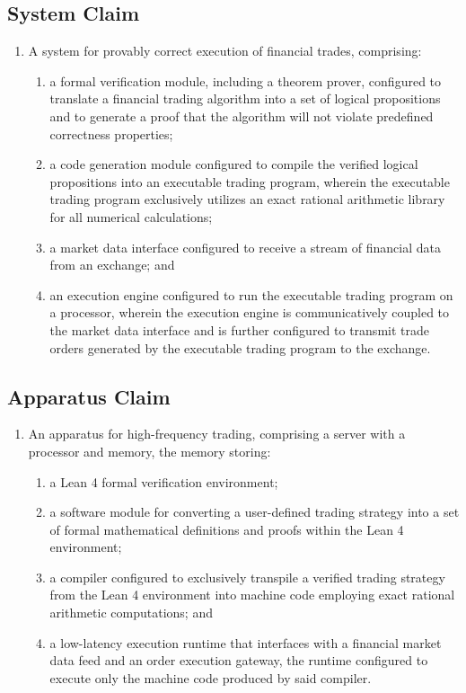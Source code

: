 \documentclass{article}
\begin{document}
\subsection{System Claim}
\begin{enumerate}[label=1.]
    \item A system for provably correct execution of financial trades, comprising:
    \begin{enumerate}[label=(\alph*)]
        \item a formal verification module, including a theorem prover, configured to translate a financial trading algorithm into a set of logical propositions and to generate a proof that the algorithm will not violate predefined correctness properties;
        \item a code generation module configured to compile the verified logical propositions into an executable trading program, wherein the executable trading program exclusively utilizes an exact rational arithmetic library for all numerical calculations;
        \item a market data interface configured to receive a stream of financial data from an exchange; and
        \item an execution engine configured to run the executable trading program on a processor, wherein the execution engine is communicatively coupled to the market data interface and is further configured to transmit trade orders generated by the executable trading program to the exchange.
    \end{enumerate}
\end{enumerate}

\subsection{Apparatus Claim}
\begin{enumerate}[label=1.]
    \item An apparatus for high-frequency trading, comprising a server with a processor and memory, the memory storing:
    \begin{enumerate}[label=(\alph*)]
        \item a Lean 4 formal verification environment;
        \item a software module for converting a user-defined trading strategy into a set of formal mathematical definitions and proofs within the Lean 4 environment;
        \item a compiler configured to exclusively transpile a verified trading strategy from the Lean 4 environment into machine code employing exact rational arithmetic computations; and
        \item a low-latency execution runtime that interfaces with a financial market data feed and an order execution gateway, the runtime configured to execute only the machine code produced by said compiler.
    \end{enumerate}
\end{enumerate}
\end{document}
